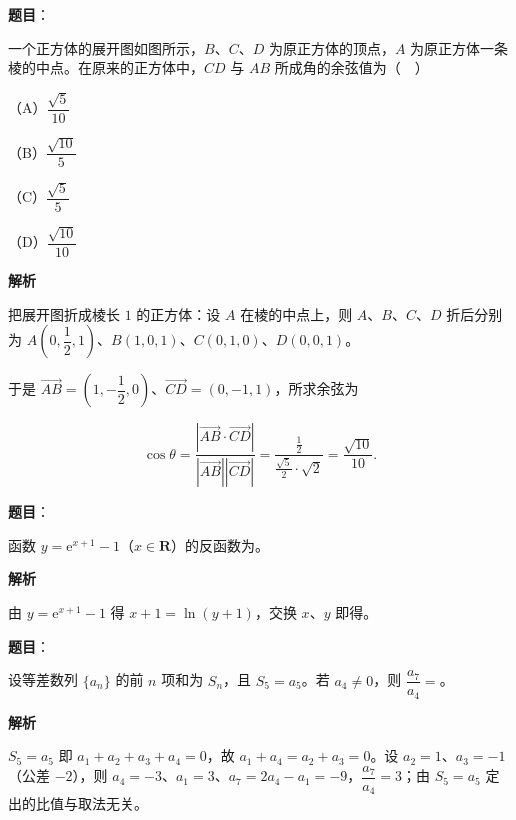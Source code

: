 \begin{answer}

\textbf{题目}：

一个正方体的展开图如图所示，$B$、$C$、$D$ 为原正方体的顶点，$A$ 为原正方体一条棱的中点。在原来的正方体中，$CD$ 与 $AB$ 所成角的余弦值为（　）

（A）$\dfrac{\sqrt5}{10}$

（B）$\dfrac{\sqrt{10}}5$

（C）$\dfrac{\sqrt5}5$

（D）$\dfrac{\sqrt{10}}{10}$
\nopagebreak[4]
\begin{center}\end{center}
\nopagebreak[4]
\textbf{解析}

把展开图折成棱长 $1$ 的正方体：设 $A$ 在棱的中点上，则 $A$、$B$、$C$、$D$ 折后分别为 $A\left(0,\dfrac12,1\right)$、$B(1,0,1)$、$C(0,1,0)$、$D(0,0,1)$。

于是 $\overrightarrow{AB}=\left(1,-\dfrac12,0\right)$、$\overrightarrow{CD}=(0,-1,1)$，所求余弦为

\nopagebreak[4]
\[\cos\theta=\frac{\left|\overrightarrow{AB}\cdot\overrightarrow{CD}\right|}{\left|\overrightarrow{AB}\right|\left|\overrightarrow{CD}\right|}=\frac{\frac12}{\frac{\sqrt5}2\cdot\sqrt2}=\frac{\sqrt{10}}{10}.\]


\end{answer}
\begin{answer}

\textbf{题目}：

函数 $y=\mathrm e^{x+1}-1$（$x\in\mathbf R$）的反函数为\gkblank{}。

\textbf{解析}

由 $y=\mathrm e^{x+1}-1$ 得 $x+1=\ln(y+1)$，交换 $x$、$y$ 即得。


\end{answer}
\begin{answer}

\textbf{题目}：

设等差数列 $\{a_n\}$ 的前 $n$ 项和为 $S_n$，且 $S_5=a_5$。若 $a_4\neq0$，则 $\dfrac{a_7}{a_4}=$\gkblank{}。

\textbf{解析}

$S_5=a_5$ 即 $a_1+a_2+a_3+a_4=0$，故 $a_1+a_4=a_2+a_3=0$。设 $a_2=1$、$a_3=-1$（公差 $-2$），则 $a_4=-3$、$a_1=3$、$a_7=2a_4-a_1=-9$，$\dfrac{a_7}{a_4}=3$；由 $S_5=a_5$ 定出的比值与取法无关。


\end{answer}
